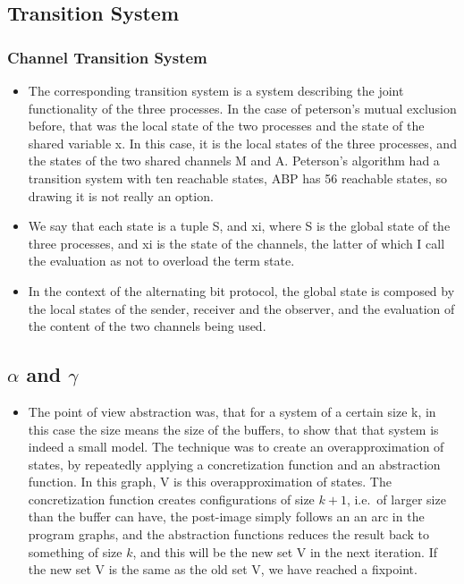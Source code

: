 \documentclass[handout]{beamer}
\begin{document}
\begin{footnotesize}
\subsection{Transition System}
\begin{frame}
  \frametitle{Channel Transition System}
  \begin{itemize}
  \item
The corresponding transition system is a system describing the joint functionality of the three processes. In the case of peterson's mutual exclusion before, that was the local state of the two processes and the state of the shared variable x. In this case, it is the local states of the three processes, and the states of the two shared channels M and A. Peterson's algorithm had a transition system with ten reachable states, ABP has 56 reachable states, so drawing it is not really an option.
\item
We say that each state is a tuple S, and xi, where S is the global state of the three processes, and xi is the state of the channels, the latter of which I call the evaluation as not to overload the term state.
\item
In the context of the alternating bit protocol, the global state is composed by the local states of the sender, receiver and the observer, and the evaluation of the content of the two channels being used.
  \end{itemize}
\end{frame}

\subsection{$\alpha$ and $\gamma$}
\begin{frame}
\begin{itemize}
\item
The point of view abstraction was, that for a system of a certain size k, in this case the size means the size of the buffers, to show that that system is indeed a small model. The technique was to create an overapproximation of states, by repeatedly applying a concretization function and an abstraction function. In this graph, V is this overapproximation of states. The concretization function creates configurations of size $k+1$, i.e.\ of larger size than the buffer can have, the post-image simply follows an an arc in the program graphs, and the abstraction functions reduces the result back to something of size $k$, and this will be the new set V in the next iteration. If the new set V is the same as the old set V, we have reached a fixpoint.
\end{itemize}
\end{frame}


\end{footnotesize}
\end{document}
